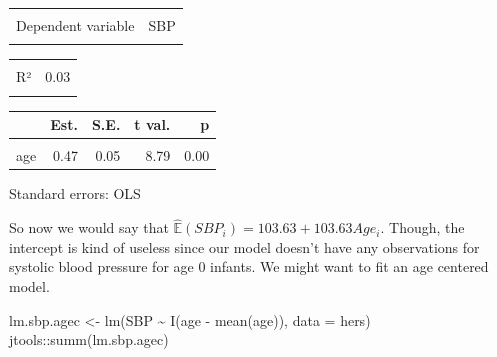 \documentclass[
  letterpaper,
  DIV=11,
  numbers=noendperiod]{scrreport}
\newenvironment{Shaded}{\begin{snugshade}}{\end{snugshade}}
\newcommand{\AttributeTok}[1]{\textcolor[rgb]{0.40,0.45,0.13}{#1}}
\newcommand{\FunctionTok}[1]{\textcolor[rgb]{0.28,0.35,0.67}{#1}}
\newcommand{\NormalTok}[1]{\textcolor[rgb]{0.00,0.23,0.31}{#1}}
\newcommand{\OtherTok}[1]{\textcolor[rgb]{0.00,0.23,0.31}{#1}}
\newcommand{\SpecialCharTok}[1]{\textcolor[rgb]{0.37,0.37,0.37}{#1}}
\begin{document}
\begin{table}[!h]
\centering
\begin{tabular}{lr}
\toprule
\cellcolor{gray!6}{Observations} & \cellcolor{gray!6}{2763}\\
Dependent variable & SBP\\
\cellcolor{gray!6}{Type} & \cellcolor{gray!6}{OLS linear regression}\\
\bottomrule
\end{tabular}
\end{table} \begin{table}[!h]
\centering
\begin{tabular}{lr}
\toprule
\cellcolor{gray!6}{F(1,2761)} & \cellcolor{gray!6}{77.21}\\
R² & 0.03\\
\cellcolor{gray!6}{Adj. R²} & \cellcolor{gray!6}{0.03}\\
\bottomrule
\end{tabular}
\end{table} \begin{table}[!h]
\centering
\begin{threeparttable}
\begin{tabular}{lrrrr}
\toprule
  & Est. & S.E. & t val. & p\\
\midrule
\cellcolor{gray!6}{(Intercept)} & \cellcolor{gray!6}{103.63} & \cellcolor{gray!6}{3.60} & \cellcolor{gray!6}{28.82} & \cellcolor{gray!6}{0.00}\\
age & 0.47 & 0.05 & 8.79 & 0.00\\
\bottomrule
\end{tabular}
\begin{tablenotes}
\item Standard errors: OLS
\end{tablenotes}
\end{threeparttable}
\end{table}

So now we would say that
\(\hat{\mathbb E}(SBP_i) = 103.63 + 103.63 Age_i\). Though, the
intercept is kind of useless since our model doesn't have any
observations for systolic blood pressure for age 0 infants. We might
want to fit an age centered model.

\begin{Shaded}
\begin{Highlighting}[]
\NormalTok{lm.sbp.agec }\OtherTok{\textless{}{-}} \FunctionTok{lm}\NormalTok{(SBP }\SpecialCharTok{\textasciitilde{}} \FunctionTok{I}\NormalTok{(age }\SpecialCharTok{{-}} \FunctionTok{mean}\NormalTok{(age)), }\AttributeTok{data =}\NormalTok{ hers)}
\NormalTok{jtools}\SpecialCharTok{::}\FunctionTok{summ}\NormalTok{(lm.sbp.agec)}
\end{Highlighting}
\end{Shaded}
\end{document}
